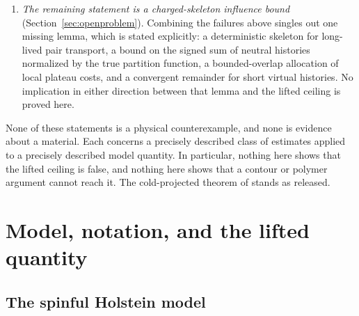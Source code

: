 \documentclass[11pt]{article}
\theoremstyle{definition}
\theoremstyle{remark}
\begin{document}
\begin{enumerate}[label=(\Alph*),leftmargin=2.2em]
lemma, which the nearest rigorous bosonic contour theorem cannot supply because it
requires a positive direct repulsion.
\item \emph{The remaining statement is a charged-skeleton influence bound}
(Section~\ref{sec:openproblem}). Combining the failures above singles out one
missing lemma, which is stated explicitly: a deterministic skeleton for
long-lived pair transport, a bound on the signed sum of neutral histories
normalized by the true partition function, a bounded-overlap allocation of local
plateau costs, and a convergent remainder for short virtual histories. No
implication in either direction between that lemma and the lifted ceiling is
proved here.
\end{enumerate}

None of these statements is a physical counterexample, and none is evidence about
a material. Each concerns a precisely described class of estimates applied to a
precisely described model quantity. In particular, nothing here shows that the
lifted ceiling is false, and nothing here shows that a contour or polymer argument
cannot reach it. The cold-projected theorem of \cite{largeu} stands as released.

\section{Model, notation, and the lifted quantity}
\label{sec:model}

\subsection{The spinful Holstein model}
\end{document}
